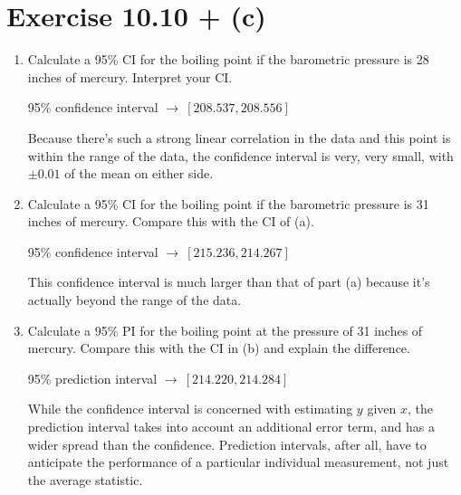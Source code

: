 \documentclass{article}
\begin{document}
\section*{Exercise 10.10 + (c)}

\begin{enumerate}[\quad(a)]
	\item Calculate a 95\% CI for the boiling point if the barometric pressure is 28 inches of mercury. Interpret your CI.

	95\% confidence interval $\rightarrow\ [208.537, 208.556]$
	
	Because there's such a strong linear correlation in the data and this point is within the range of the data, the confidence interval is very, very small, with $\pm 0.01$ of the mean on either side.
	\item Calculate a 95\% CI for the boiling point if the barometric pressure is 31 inches of mercury. Compare this with the CI of (a).

	95\% confidence interval $\rightarrow\ [215.236, 214.267]$

	This confidence interval is much larger than that of part (a) because it's actually beyond the range of the data.
	\item Calculate a 95\% PI for the boiling point at the pressure of 31 inches of mercury. Compare this with the CI in (b) and explain the difference.

	95\% prediction interval $\rightarrow\ [214.220, 214.284]$

	While the confidence interval is concerned with estimating $y$ given $x$, the prediction interval takes into account an additional error term, and has a wider spread than the confidence. Prediction intervals, after all, have to anticipate the performance of a particular individual measurement, not just the average statistic.
\end{enumerate}
\end{document}

